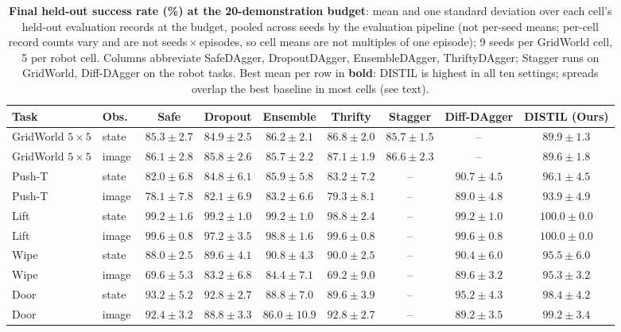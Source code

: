 \documentclass[letterpaper]{article} %
\begin{document}
\begin{table}[t]
\centering
\small
\setlength{\tabcolsep}{4pt}
\caption{\textbf{Final held-out success rate (\%) at the 20-demonstration
budget}: mean and one standard deviation over each cell's held-out
evaluation records at the budget, pooled across seeds by the evaluation
pipeline (not per-seed means; per-cell record counts vary and are not
seeds\,$\times$\,episodes, so cell means are not multiples of one
episode); 9 seeds per GridWorld cell, 5 per robot cell.
Columns abbreviate SafeDAgger, DropoutDAgger, EnsembleDAgger,
ThriftyDAgger; Stagger runs on GridWorld, Diff-DAgger on the robot tasks.
Best mean per row in \textbf{bold}: DISTIL is highest in all ten settings;
spreads overlap the best baseline in most cells (see text).}
\label{tab:main}
\begin{tabular}{llccccccc}
\toprule
Task & Obs.\ & Safe & Dropout & Ensemble & Thrifty & Stagger & Diff-DAgger & DISTIL (Ours) \\
\midrule
GridWorld $5{\times}5$ & state & $85.3 \pm 2.7$ & $84.9 \pm 2.5$ & $86.2 \pm 2.1$ & $86.8 \pm 2.0$ & $85.7 \pm 1.5$ & -- &$\mathbf{89.9 \pm 1.3}$ \\
GridWorld $5{\times}5$ & image & $86.1 \pm 2.8$ & $85.8 \pm 2.6$ & $85.7 \pm 2.2$ & $87.1 \pm 1.9$ & $86.6 \pm 2.3$ & -- &$\mathbf{89.6 \pm 1.8}$ \\
\addlinespace
Push-T & state & $82.0 \pm 6.8$ & $84.8 \pm 6.1$ & $85.9 \pm 5.8$ & $83.2 \pm 7.2$ & -- &$90.7 \pm 4.5$ & $\mathbf{96.1 \pm 4.5}$ \\
Push-T & image & $78.1 \pm 7.8$ & $82.1 \pm 6.9$ & $83.2 \pm 6.6$ & $79.3 \pm 8.1$ & -- &$89.0 \pm 4.8$ & $\mathbf{93.9 \pm 4.9}$ \\
\addlinespace
Lift & state & $99.2 \pm 1.6$ & $99.2 \pm 1.0$ & $99.2 \pm 1.0$ & $98.8 \pm 2.4$ & -- &$99.2 \pm 1.0$ & $\mathbf{100.0 \pm 0.0}$ \\
Lift & image & $99.6 \pm 0.8$ & $97.2 \pm 3.5$ & $98.8 \pm 1.6$ & $99.6 \pm 0.8$ & -- &$99.6 \pm 0.8$ & $\mathbf{100.0 \pm 0.0}$ \\
\addlinespace
Wipe & state & $88.0 \pm 2.5$ & $89.6 \pm 4.1$ & $90.8 \pm 4.3$ & $90.0 \pm 2.5$ & -- &$90.4 \pm 6.0$ & $\mathbf{95.5 \pm 6.0}$ \\
Wipe & image & $69.6 \pm 5.3$ & $83.2 \pm 6.8$ & $84.4 \pm 7.1$ & $69.2 \pm 9.0$ & -- &$89.6 \pm 3.2$ & $\mathbf{95.3 \pm 3.2}$ \\
\addlinespace
Door & state & $93.2 \pm 5.2$ & $92.8 \pm 2.7$ & $88.8 \pm 7.0$ & $89.6 \pm 3.9$ & -- &$95.2 \pm 4.3$ & $\mathbf{98.4 \pm 4.2}$ \\
Door & image & $92.4 \pm 3.2$ & $88.8 \pm 3.3$ & $86.0 \pm 10.9$ & $92.8 \pm 2.7$ & -- &$89.2 \pm 3.5$ & $\mathbf{99.2 \pm 3.4}$ \\
\bottomrule
\end{tabular}
\end{table}
\end{document}
